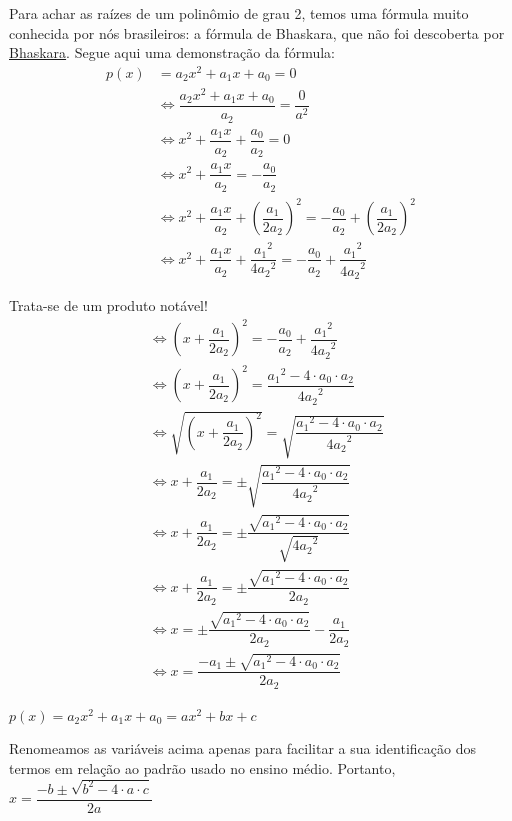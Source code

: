 \documentclass[
  portuguese,
  letterpaper,
  DIV=11,
  numbers=noendperiod]{scrreport}
\begin{document}
Para achar as raízes de um polinômio de grau 2, temos uma fórmula muito
conhecida por nós brasileiros: a fórmula de Bhaskara, que não foi
descoberta por
\href{https://pt.wikipedia.org/wiki/F\%C3\%B3rmula_quadr\%C3\%A1tica\#Desenvolvimento_hist\%C3\%B3rico}{Bhaskara}.
Segue aqui uma demonstração da fórmula: \[
\begin{aligned}
    p(x) &= a_2x^2+a_1x+a_0 = 0 \\
    &\Leftrightarrow \dfrac{a_2x^2+a_1x+a_0}{a_2} = \dfrac{0}{a^2} \\
    &\Leftrightarrow x^2 + \dfrac{a_1x}{a_2} + \dfrac{a_0}{a_2} = 0 \\
    &\Leftrightarrow x^2 + \dfrac{a_1x}{a_2} = - \dfrac{a_0}{a_2} \\
    &\Leftrightarrow x^2 + \dfrac{a_1x}{a_2} + \left(\dfrac{a_1}{2a_2}\right)^2 = - \dfrac{a_0}{a_2}+\left(\dfrac{a_1}{2a_2}\right)^2 \\
    &\Leftrightarrow x^2 + \dfrac{a_1x}{a_2} + \dfrac{{a_1}^2}{4{a_2}^2} = - \dfrac{a_0}{a_2}+\dfrac{{a_1}^2}{{4a_2}^2}
\end{aligned}
\]

Trata-se de um produto notável! \[
\begin{aligned}
    &\Leftrightarrow  \left(x+\dfrac{a_1}{2a_2}\right)^2 = - \dfrac{a_0}{a_2}+\dfrac{{a_1}^2}{{4a_2}^2} \\
    &\Leftrightarrow  \left(x+\dfrac{a_1}{2a_2}\right)^2 = \dfrac{{a_1}^2-4 \cdot a_0 \cdot a_2}{{4a_2}^2} \\
    &\Leftrightarrow  \sqrt{\left(x+\dfrac{a_1}{2a_2}\right)^2}=\sqrt{ \dfrac{{a_1}^2-4 \cdot a_0 \cdot a_2}{{4a_2}^2}} \\
    &\Leftrightarrow  x+\dfrac{a_1}{2a_2} = \pm \sqrt{ \dfrac{{a_1}^2-4 \cdot a_0 \cdot a_2}{{4a_2}^2}} \\
    &\Leftrightarrow  x+\dfrac{a_1}{2a_2} = \pm { \dfrac{\sqrt{{a_1}^2-4 \cdot a_0 \cdot a_2}}{\sqrt{{4a_2}^2}}} \\
    &\Leftrightarrow  x+\dfrac{a_1}{2a_2} = \pm { \dfrac{\sqrt{{a_1}^2-4 \cdot a_0 \cdot a_2}}{2a_2}} \\
    &\Leftrightarrow  x = \pm { \dfrac{\sqrt{{a_1}^2-4 \cdot a_0 \cdot a_2}}{2a_2}}-\dfrac{a_1}{2a_2} \\
    &\Leftrightarrow  x = { \dfrac{-a_1 \pm\sqrt{{a_1}^2-4 \cdot a_0 \cdot a_2}}{2a_2}}
\end{aligned}
\]

\(p(x) = a_2x^2+a_1x+a_0 = ax^2+bx+c\)

Renomeamos as variáveis acima apenas para facilitar a sua identificação
dos termos em relação ao padrão usado no ensino médio. Portanto,
\(x = \dfrac{-b \pm \sqrt{b^2-4 \cdot a \cdot c }}{2a}\)
\end{document}
